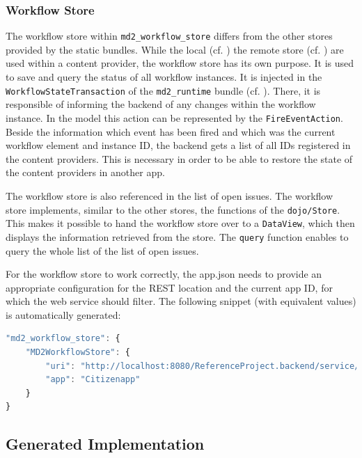 \subsubsection{Workflow Store} \label{workflow_store}

The workflow store within \lstinline|md2_workflow_store| differs from the other stores provided by the static bundles. While the local (cf. ) the remote store (cf. ) are used within a content provider, the workflow store has its own purpose. It is used to save and query the status of all workflow instances. It is injected in the \lstinline|WorkflowStateTransaction| of the \lstinline|md2_runtime| bundle (cf. ). There, it is responsible of informing the backend of any changes within the workflow instance. In the model this action can be represented by the \lstinline|FireEventAction|. Beside the information which event has been fired and which was the current workflow element and instance ID, the backend gets a list of all IDs registered in the content providers. This is necessary in order to be able to restore the state of the content providers in another app.

The workflow store is also referenced in the list of open issues. The workflow store implements, similar to the other stores, the functions of the \lstinline|dojo/Store|. This makes it possible to hand the workflow store over to a \lstinline|DataView|, which then displays the information retrieved from the store. The \lstinline|query| function enables to query the whole list of the list of open issues.

For the workflow store to work correctly, the app.json needs to provide an appropriate configuration for the REST location and the current app ID, for which the web service should filter. The following snippet (with equivalent values) is automatically generated:
\begin{lstlisting}[language=Javascript]
"md2_workflow_store": {
	"MD2WorkflowStore": {
		"uri": "http://localhost:8080/ReferenceProject.backend/service/workflowState/",
		"app": "Citizenapp"
	}
}
\end{lstlisting}


\subsection{Generated \mapapps Implementation} 

